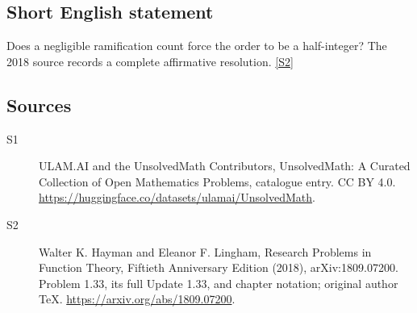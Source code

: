 \documentclass[11pt]{article}
\newcommand{\sref}[2]{\hyperlink{source:#1:#2}{[S#2]}}
\begin{document}
\subsection{Short English statement}
Does a negligible ramification count force the order to be a half-integer? The 2018 source records a complete affirmative resolution. \sref{statement}{2}
\subsection{Sources}
\begin{description}
\item[\hypertarget{source:statement:1}{S1}] ULAM.AI and the UnsolvedMath Contributors, UnsolvedMath: A Curated Collection of Open Mathematics Problems, catalogue entry. CC BY 4.0. \url{https://huggingface.co/datasets/ulamai/UnsolvedMath}.
\item[\hypertarget{source:statement:2}{S2}] Walter K. Hayman and Eleanor F. Lingham, Research Problems in Function Theory, Fiftieth Anniversary Edition (2018), arXiv:1809.07200. Problem 1.33, its full Update 1.33, and chapter notation; original author TeX. \url{https://arxiv.org/abs/1809.07200}.
\end{description}
\label{end:statement}
\end{document}
